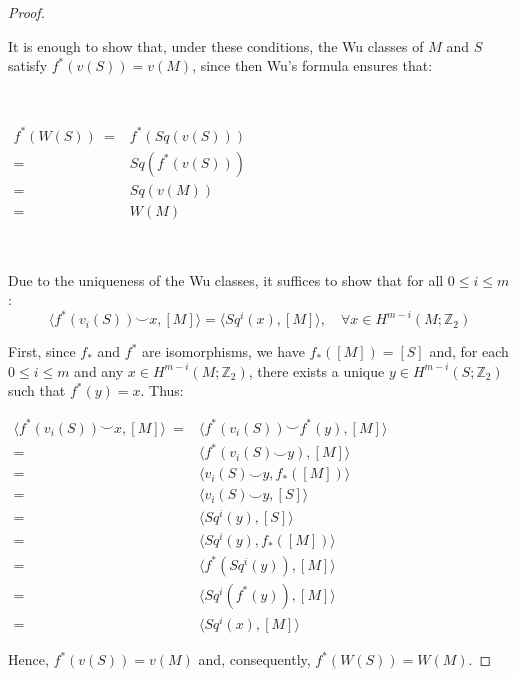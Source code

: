 \documentclass[12pt,oneside]{book}
\newcommand{\Z}{\mathbb{Z}}
\newcommand{\ccup}{\smile}
\begin{document}
    \begin{proof}

        \

        It is enough to show that, under these conditions, the Wu classes of $M$ and $S$ satisfy $f^{*}(v(S)) = v(M)$, 
        since then Wu’s formula ensures that:

        \

        $ \begin{array}{rl}
        	f^{*}(W(S)) \ = & f^{*}(Sq(v(S))) \\
        	= & Sq(f^{*}(v(S))) \\
        	= & Sq(v(M)) \\
        	= & W(M)
        \end{array} $

        \

        Due to the uniqueness of the Wu classes, it suffices to show that for all $0 \leq i \leq m$:
        $$ \langle f^{*}(v_{i}(S)) \ccup x, [M] \rangle = \langle Sq^{i}(x), [M] \rangle, \quad \forall x \in H^{m-i}(M; \Z_{2}) $$

        First, since $f_{*}$ and $f^{*}$ are isomorphisms, we have $f_{*}([M]) = [S]$ and, for each $0 \leq i \leq m$ and any 
        $x \in H^{m-i}(M; \Z_{2})$, there exists a unique $y \in H^{m-i}(S; \Z_{2})$ such that $f^{*}(y) = x$. Thus:

        $ \begin{array}{rl}
        	\langle f^{*}(v_{i}(S)) \ccup x, [M] \rangle \ = & \langle f^{*}(v_{i}(S)) \ccup f^{*}(y), [M] \rangle \\
        	= & \langle f^{*}(v_{i}(S) \ccup y), [M] \rangle \\
        	= & \langle v_{i}(S) \ccup y, f_{*}([M]) \rangle \\
        	= & \langle v_{i}(S) \ccup y, [S] \rangle \\
        	= & \langle Sq^{i}(y), [S] \rangle \\
        	= & \langle Sq^{i}(y), f_{*}([M]) \rangle \\
        	= & \langle f^{*}(Sq^{i}(y)), [M] \rangle \\
        	= & \langle Sq^{i}(f^{*}(y)), [M] \rangle \\
        	= & \langle Sq^{i}(x), [M] \rangle
        \end{array} $

        Hence, $f^{*}(v(S)) = v(M)$ and, consequently, $f^{*}(W(S)) = W(M)$.

    \end{proof}
\end{document}
